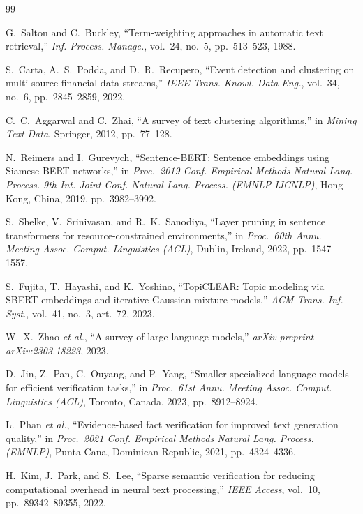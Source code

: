\documentclass[conference]{IEEEtran}
\begin{document}
\begin{thebibliography}{99}
\footnotesize
\setlength{\itemsep}{1pt}
\setlength{\parskip}{0pt}

G.~Salton and C.~Buckley, ``Term-weighting approaches in automatic text retrieval,'' \textit{Inf. Process. Manage.}, vol.~24, no.~5, pp.\ 513--523, 1988.

S.~Carta, A.~S.~Podda, and D.~R.~Recupero, ``Event detection and clustering on multi-source financial data streams,'' \textit{IEEE Trans. Knowl. Data Eng.}, vol.~34, no.~6, pp.\ 2845--2859, 2022.

C.~C.~Aggarwal and C.~Zhai, ``A survey of text clustering algorithms,'' in \textit{Mining Text Data}, Springer, 2012, pp.\ 77--128.

N.~Reimers and I.~Gurevych, ``Sentence-BERT: Sentence embeddings using Siamese BERT-networks,'' in \textit{Proc.\ 2019 Conf. Empirical Methods Natural Lang. Process. 9th Int. Joint Conf. Natural Lang. Process. (EMNLP-IJCNLP)}, Hong Kong, China, 2019, pp.\ 3982--3992.

S.~Shelke, V.~Srinivasan, and R.~K.~Sanodiya, ``Layer pruning in sentence transformers for resource-constrained environments,'' in \textit{Proc.\ 60th Annu. Meeting Assoc. Comput. Linguistics (ACL)}, Dublin, Ireland, 2022, pp.\ 1547--1557.

S.~Fujita, T.~Hayashi, and K.~Yoshino, ``TopiCLEAR: Topic modeling via SBERT embeddings and iterative Gaussian mixture models,'' \textit{ACM Trans. Inf. Syst.}, vol.~41, no.~3, art.~72, 2023.

W.~X.~Zhao \textit{et al.}, ``A survey of large language models,'' \textit{arXiv preprint arXiv:2303.18223}, 2023.

D.~Jin, Z.~Pan, C.~Ouyang, and P.~Yang, ``Smaller specialized language models for efficient verification tasks,'' in \textit{Proc.\ 61st Annu. Meeting Assoc. Comput. Linguistics (ACL)}, Toronto, Canada, 2023, pp.\ 8912--8924.

L.~Phan \textit{et al.}, ``Evidence-based fact verification for improved text generation quality,'' in \textit{Proc.\ 2021 Conf. Empirical Methods Natural Lang. Process. (EMNLP)}, Punta Cana, Dominican Republic, 2021, pp.\ 4324--4336.

H.~Kim, J.~Park, and S.~Lee, ``Sparse semantic verification for reducing computational overhead in neural text processing,'' \textit{IEEE Access}, vol.~10, pp.\ 89342--89355, 2022.

\end{thebibliography}
\end{document}
